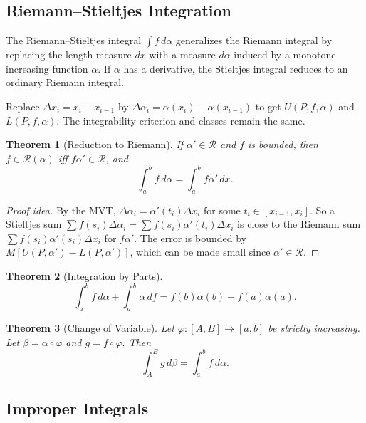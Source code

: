 \documentclass[11pt]{article}
\theoremstyle{myplain}
\newtheorem{theorem}{Theorem}[section]
\theoremstyle{definition}
\theoremstyle{remark}
\begin{document}
\subsection{Riemann--Stieltjes Integration}

\begin{bigpicture}
The Riemann--Stieltjes integral $\int f\,d\alpha$ generalizes the Riemann integral by replacing the length measure $dx$ with a measure $d\alpha$ induced by a monotone increasing function $\alpha$. If $\alpha$ has a derivative, the Stieltjes integral reduces to an ordinary Riemann integral.
\end{bigpicture}

Replace $\Delta x_i = x_i - x_{i-1}$ by $\Delta\alpha_i = \alpha(x_i) - \alpha(x_{i-1})$ to get $U(P,f,\alpha)$ and $L(P,f,\alpha)$. The integrability criterion and classes remain the same.

\begin{theorem}[Reduction to Riemann]
If $\alpha' \in \mathscr{R}$ and $f$ is bounded, then $f \in \mathscr{R}(\alpha)$ iff $f\alpha' \in \mathscr{R}$, and
$$\int_a^b f\,d\alpha = \int_a^b f\alpha'\,dx.$$
\end{theorem}

\begin{proof}[Proof idea]
By the MVT, $\Delta\alpha_i = \alpha'(t_i)\Delta x_i$ for some $t_i \in [x_{i-1},x_i]$. So a Stieltjes sum $\sum f(s_i)\Delta\alpha_i = \sum f(s_i)\alpha'(t_i)\Delta x_i$ is close to the Riemann sum $\sum f(s_i)\alpha'(s_i)\Delta x_i$ for $f\alpha'$. The error is bounded by $M[U(P,\alpha') - L(P,\alpha')]$, which can be made small since $\alpha' \in \mathscr{R}$.
\end{proof}

\begin{theorem}[Integration by Parts]
$$\int_a^b f\,d\alpha + \int_a^b \alpha\,df = f(b)\alpha(b) - f(a)\alpha(a).$$
\end{theorem}

\begin{theorem}[Change of Variable]
Let $\varphi: [A,B] \to [a,b]$ be strictly increasing. Let $\beta = \alpha \circ \varphi$ and $g = f \circ \varphi$. Then
$$\int_A^B g\,d\beta = \int_a^b f\,d\alpha.$$
\end{theorem}

\subsection{Improper Integrals}
\end{document}
